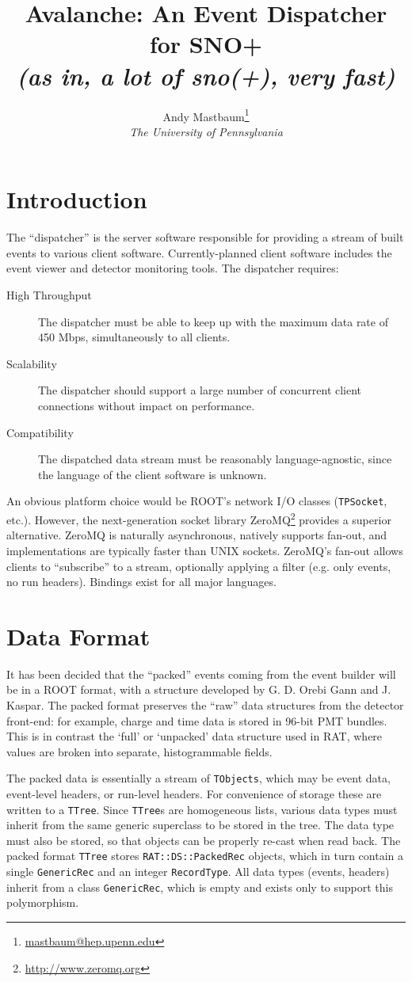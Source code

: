 \documentclass{article}
\title{Avalanche: An Event Dispatcher for SNO+\\{\it \small (as in, a lot of sno(+), very fast)}}
\author{Andy Mastbaum\footnote{\href{mailto:mastbaum@hep.upenn.edu}{mastbaum@hep.upenn.edu}}\\\small{\it The University of Pennsylvania}}
\begin{document}
\maketitle
\section{Introduction}
The ``dispatcher'' is the server software responsible for providing a stream of built events to various client software. Currently-planned client software includes the event viewer and detector monitoring tools. The dispatcher requires:

\begin{description}
\item[High Throughput] The dispatcher must be able to keep up with the maximum data rate of 450 Mbps, simultaneously to all clients.
\item[Scalability] The dispatcher should support a large number of concurrent client connections without impact on performance.
\item[Compatibility] The dispatched data stream must be reasonably language-agnostic, since the language of the client software is unknown.
\end{description}

An obvious platform choice would be ROOT's network I/O classes ({\tt TPSocket}, etc.). However, the next-generation socket library ZeroMQ\footnote{\href{http://www.zeromq.org}{http://www.zeromq.org}} provides a superior alternative. ZeroMQ is naturally asynchronous, natively supports fan-out, and implementations are typically faster than UNIX sockets. ZeroMQ's fan-out allows clients to ``subscribe'' to a stream, optionally applying a filter (e.g. only events, no run headers). Bindings exist for all major languages.

\section{Data Format}
It has been decided that the ``packed'' events coming from the event builder will be in a ROOT format, with a structure developed by G. D. Orebi Gann and J. Kaspar. The packed format preserves the ``raw'' data structures from the detector front-end: for example, charge and time data is stored in 96-bit PMT bundles. This is in contrast the `full' or `unpacked' data structure used in RAT, where values are broken into separate, histogrammable fields.

The packed data is essentially a stream of {\tt TObjects}, which may be event data, event-level headers, or run-level headers. For convenience of storage these are written to a {\tt TTree}. Since {\tt TTree}s are homogeneous lists, various data types must inherit from the same generic superclass to be stored in the tree. The data type must also be stored, so that objects can be properly re-cast when read back. The packed format {\tt TTree} stores {\tt RAT::DS::PackedRec} objects, which in turn contain a single {\tt GenericRec} and an integer {\tt RecordType}. All data types (events, headers) inherit from a class {\tt GenericRec}, which is empty and exists only to support this polymorphism.
\end{document}
